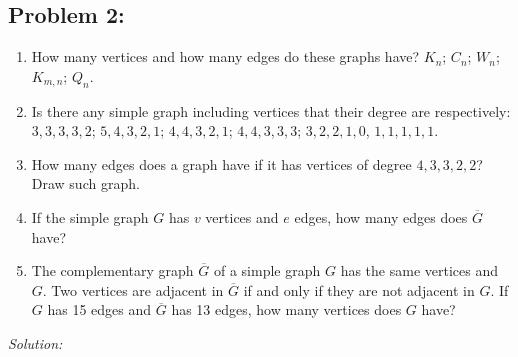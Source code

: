 \documentclass[a4paper]{article}
\begin{document}
	\subsection*{Problem 2:}
	\begin{enumerate}
		\item How many vertices and how many edges do these graphs have? $K_n$; $C_n$; $W_n$; $K_{m, n}$; $Q_n$.
		\item Is there any simple graph including vertices that their degree are respectively: $3 ,3 ,3, 3, 2$; $5, 4, 3, 2, 1$; $4, 4, 3, 2 ,1$; $4, 4, 3, 3, 3$; $3, 2, 2, 1, 0$, $1, 1, 1, 1, 1$.
		\item How many edges does a graph have if it has vertices of degree $4, 3, 3, 2, 2$? Draw such graph.
		\item If the simple graph $G$ has $v$ vertices and $e$ edges, how many edges does $\overline{G}$ have?
		\item The complementary graph $\overline{G}$ of a simple graph $G$ has the same vertices and $G$. Two vertices are adjacent in $\overline{G}$ if and only if they are not adjacent in $G$. If $G$ has 15 edges and $\overline{G}$ has 13 edges, how many vertices does $G$ have?
	\end{enumerate}
	\textit{Solution:} \\
\end{document}
